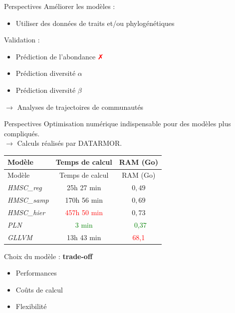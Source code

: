 \documentclass[%
]{beamer}
\begin{document}
	\begin{frame}{Perspectives}
	Améliorer les modèles :\vspace{\baselineskip}\\
	\begin{itemize}
		\item Utiliser des données de traits et/ou phylogénétiques
	\end{itemize}\pause\vspace{4\baselineskip}
	Validation :
	\begin{itemize}
		\item Prédiction de l'abondance \textcolor{red}{\faClose}
		\item Prédiction diversité $\alpha$ \textcolor{green}{\faCheckSquare}
		\item Prédiction diversité $\beta$ \textcolor{blue}{\faQuestionCircle}
	\end{itemize}
	\quad\quad\quad$\rightarrow$ Analyses de trajectoires de communautés~\citep{De_Caceres_2019}
	\end{frame}
	
	\begin{frame}{Perspectives}
	Optimisation numérique indispensable pour des modèles plus compliqués.\vspace{\baselineskip}\\\pause
	\quad\quad\quad$\rightarrow$ Calculs réalisés par DATARMOR.\vfill
		\begin{longtable}[]{lcc}
			\toprule
			Modèle & Temps de calcul & RAM (Go)\tabularnewline
			\midrule
			\endfirsthead
			\toprule
			Modèle & Temps de calcul & RAM (Go)\tabularnewline
			\midrule
			\endhead
			\emph{HMSC\_reg} & 25h 27 min & \(0,49\)\tabularnewline
			\emph{HMSC\_samp} &170h 56 min & \(0,69\)\tabularnewline
			\emph{HMSC\_hier} & \textcolor{red}{457h 50 min} & \(0,73\)\tabularnewline
			\emph{PLN} & \textcolor{green}{3 min} & ~\textcolor{green}{0,37}\tabularnewline
			\emph{GLLVM} & 13h 43 min & \textcolor{red}{68,1}\tabularnewline
			\bottomrule
		\end{longtable}
	
	Choix du modèle : \textbf{trade-off}
	\begin{itemize}
		\item Performances
		\item Coûts de calcul
		\item Flexibilité
	\end{itemize}
	
	\end{frame}
	
\end{document}
